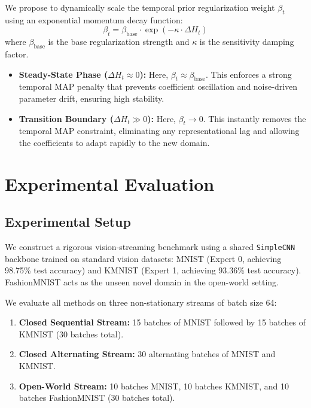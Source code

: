 \documentclass{article}
\begin{document}
We propose to dynamically scale the temporal prior regularization weight $\beta_t$ using an exponential momentum decay function:
\begin{equation}
    \beta_t = \beta_{\text{base}} \cdot \exp(-\kappa \cdot \Delta H_t)
\end{equation}
where $\beta_{\text{base}}$ is the base regularization strength and $\kappa$ is the sensitivity damping factor.
\begin{itemize}
    \item \textbf{Steady-State Phase ($\Delta H_t \approx 0$):} Here, $\beta_t \approx \beta_{\text{base}}$. This enforces a strong temporal MAP penalty that prevents coefficient oscillation and noise-driven parameter drift, ensuring high stability.
    \item \textbf{Transition Boundary ($\Delta H_t \gg 0$):} Here, $\beta_t \to 0$. This instantly removes the temporal MAP constraint, eliminating any representational lag and allowing the coefficients to adapt rapidly to the new domain.
\end{itemize}

\section{Experimental Evaluation}
\subsection{Experimental Setup}
We construct a rigorous vision-streaming benchmark using a shared \texttt{SimpleCNN} backbone trained on standard vision datasets: MNIST (Expert 0, achieving 98.75\% test accuracy) and KMNIST (Expert 1, achieving 93.36\% test accuracy). FashionMNIST acts as the unseen novel domain in the open-world setting.

We evaluate all methods on three non-stationary streams of batch size 64:
\begin{enumerate}
    \item \textbf{Closed Sequential Stream:} 15 batches of MNIST followed by 15 batches of KMNIST (30 batches total).
    \item \textbf{Closed Alternating Stream:} 30 alternating batches of MNIST and KMNIST.
    \item \textbf{Open-World Stream:} 10 batches MNIST, 10 batches KMNIST, and 10 batches FashionMNIST (30 batches total).
\end{enumerate}
\end{document}
